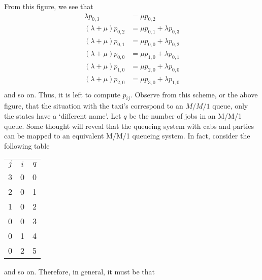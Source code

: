 \begin{exercise}[Hall 5.22]
\begin{solution}
\begin{center}
      
    \end{center}

From this figure, we see that
\begin{align*}
\lambda p_{0,3} &= \mu p_{0,2} \\
(\lambda+\mu) p_{0,2} &= \mu p_{0,1} + \lambda p_{0,3}\\
(\lambda+\mu) p_{0,1} &= \mu p_{0,0} + \lambda p_{0,2}\\
(\lambda+\mu) p_{0,0} &= \mu p_{1,0} + \lambda p_{0,1}\\
(\lambda+\mu) p_{1,0} &= \mu p_{2,0} + \lambda p_{0,0}\\
(\lambda+\mu) p_{2,0} &= \mu p_{3,0} + \lambda p_{1,0}\\
\end{align*}
and so on. Thus, it is left to compute $p_{ij}$. Observe from this
scheme, or the above figure, that the situation with the taxi's
correspond to an $M/M/1$ queue, only the states have a `different
name'. Let $q$ be the number of jobs in an M/M/1 queue. Some thought
will reveal that the queueing system with cabs and parties can be
mapped to an equivalent M/M/1 queueing system. In fact, consider the
following table
\begin{center}
\begin{tabular}{ccc}
$j$ & $i$ & $q$\\
3&         0 &         0\\
2 &        0&          1\\
1 &        0&          2\\
0&         0&          3\\
0&         1&          4\\
0&         2&          5\\
\end{tabular}
\end{center}
and so on. Therefore, in general, it must be that 


\end{solution}
\end{exercise}

